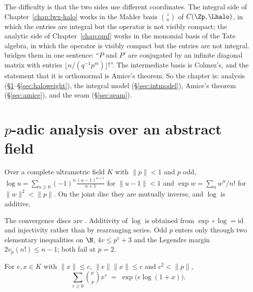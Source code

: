 The difficulty is that the two sides use different coordinates.  The integral side of
Chapter~\ref{chap:lwx-halo} works in the Mahler basis $\binom{z}{n}$ of $C(\Zp, \Lhalo)$, in
which the entries are integral but the operator is not visibly compact; the analytic side of
Chapter~\ref{chap:qmf} works in the monomial basis of the Tate algebra, in which the operator is
visibly compact but the entries are not integral.  \cite[proof of Proposition 2.17]{LWX} bridges
them in one sentence: ``$P$ and $P'$ are conjugated by an infinite diagonal matrix with entries
$\lfloor n/(q^{-1}p^{m})\rfloor!$''.  The intermediate basis is Colmez's, and the statement that
it is orthonormal is Amice's theorem.  So the chapter is: analysis
(\S\ref{sec:explog}--\S\ref{sec:haloweight}), the integral model (\S\ref{sec:intmodel}), Amice's
theorem (\S\ref{sec:amice}), and the seam (\S\ref{sec:seam}).

\section{$p$-adic analysis over an abstract field}
\label{sec:explog}

\begin{definition}
  \label{def:padicexplog}
  \leanok
  Over a complete ultrametric field $K$ with $\lVert p\rVert<1$ and $p$ odd,
  $\log u = \sum_{n\ge0}(-1)^{n}\tfrac{(u-1)^{n+1}}{n+1}$ for $\lVert u-1\rVert<1$ and
  $\exp w = \sum_n w^{n}/n!$ for $\lVert w\rVert^{2}<\lVert p\rVert$.  On the joint disc they are
  mutually inverse, and $\log$ is additive.
\end{definition}

The convergence discs are \cite[Chapter IV \S2]{Koblitz}.  Additivity of $\log$ is obtained from
$\exp\circ\log = \mathrm{id}$ and injectivity rather than by rearranging series.  Odd $p$ enters
only through two elementary inequalities on $\N$, $4v\leq p^{v}+3$ and the Legendre margin
$2v_p(n!)\leq n-1$; both fail at $p=2$.

\begin{theorem}
  \label{thm:padic-binomial}
  \leanok
  For $e, x \in K$ with $\lVert x\rVert\leq c$, $\lVert e\rVert\lVert x\rVert\leq c$ and
  $c^{2}<\lVert p\rVert$,
  \[
    \sum_{r\geq 0}\binom{e}{r}x^{r} \;=\; \exp\bigl(e\log(1+x)\bigr).
  \]
\end{theorem}

